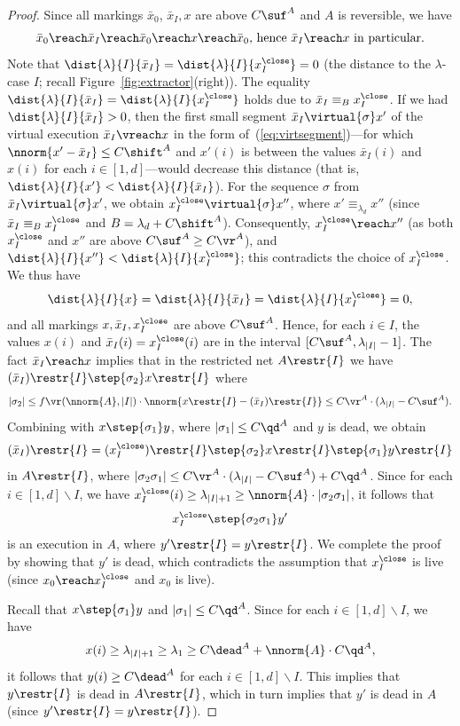 \begin{proof}
	Since all markings $\bar{x}_0$, $\bar{x}_I, x$ are above $C\suf^A$
and $A$ is
	reversible, we have 
	\[\bar{x}_0\reach \bar{x}_I\reach \bar{x}_0\reach
	x\reach\bar{x}_0\text{, hence }\bar{x}_I\reach x\text{ in
	particular.}\]
Note that $\dist{\lambda}{I}{\bar{x}_I}=\dist{\lambda}{I}{x^\close_I}=0$
(the distance to the $\lambda$-case $I$;
recall Figure~\ref{fig:extractor}(right)).
	The equality
	$\dist{\lambda}{I}{\bar{x}_I}=\dist{\lambda}{I}{x^\close_I}$
holds due to $\bar{x}_I\equiv_{B}x^\close_I$. If we had 
	$\dist{\lambda}{I}{\bar{x}_I}>0$, then 
	the first small segment $\bar{x}_I\virtual{\sigma}x'$
	of the virtual execution
	$\bar{x}_I\vreach x$ in the form
	of~(\ref{eq:virtsegment})---for which
	$\nnorm{x'-\bar{x}_I}\leq C\shift^A$ and 
	$x'(i)$ is between the values $\bar{x}_I(i)$ and $x(i)$ for
	each
	$i\in[1,d]$---would decrease this distance 
(that is, $\dist{\lambda}{I}{x'}<\dist{\lambda}{I}{\bar{x}_I}$).
For the sequence $\sigma$ from $\bar{x}_I\virtual{\sigma}x'$, we obtain 
 $x^\close_I\virtual{\sigma}x''$, where  $x'\equiv_{\lambda_d}x''$
 (since  $\bar{x}_I\equiv_{B}x^\close_I$ and
$B=\lambda_d+C\shift^A$). Consequently, 
$x^\close_I\reach x''$ (as both $x^\close_I$ and $x''$ are above
$C\suf^A\geq C\vr^A$), 
and
$\dist{\lambda}{I}{x''}<\dist{\lambda}{I}{x^\close_I}$; this contradicts the choice
of  $x^\close_I$.
We thus have
\[\dist{\lambda}{I}{x}=\dist{\lambda}{I}{\bar{x}_I}=\dist{\lambda}{I}{x^\close_I}=0,\]
and all markings $x,\bar{x}_I,x^\close_I$ are above $C\suf^A$.
Hence, for each $i\in I$, the values $x(i)$ and
$\bar{x}_I(i)=x^\close_I(i)$ are in the interval
$[C\suf^A,\lambda_{|I|}-1]$.
The fact 
$\bar{x}_I\reach x$ implies that in the restricted net $A\restr{I}$ we
have 
$(\bar{x}_I)\restr{I}\step{\sigma_2}x\restr{I}$ where 
\[|\sigma_2|\leq f\vr(\nnorm{A},|I|)\cdot
\nnorm{x\restr{I}-(\bar{x}_I)\restr{I}}\leq C\vr^A\cdot
(\lambda_{|I|}-C\suf^A).\]
Combining with $x\step{\sigma_1}y$, where $|\sigma_1|\leq
C\qd^A$ and $y$ is dead, we obtain
\[(\bar{x}_{I})\restr{I}=(x^\close_{I})\restr{I}\step{\sigma_2}
x\restr{I}\step{\sigma_1}y\restr{I}\]
in $A\restr{I}$, where $|\sigma_2\sigma_1|\leq C\vr^{A}\cdot
(\lambda_{|I|}-C\suf^A)+C\qd^A$.
Since for each $i\in [1,d]\smallsetminus I$, we have
$x^\close_{I}(i)\geq\lambda_{|I|+1}\geq \nnorm{A}\cdot
|\sigma_2\sigma_1|$, it follows that 
\[x^\close_{I}\step{\sigma_2\sigma_1}y'\]
is an execution in $A$, where $y'\restr{I}=y\restr{I}$.
We complete the proof by showing that $y'$ is dead, which
contradicts the assumption that $x^\close_{I}$ is live (since 
$x_0\reach x^\close_{I}$ and $x_0$ is live).

Recall that $x\step{\sigma_1}y$ and $|\sigma_1|\leq C\qd^A$.
Since for each $i\in [1,d]\smallsetminus I$, we have 
\[x(i)\geq
\lambda_{|I|+1}\geq \lambda_1\geq C\dead^A+ \nnorm{A}\cdot C\qd^A,\]
it follows that 
$y(i)\geq C\dead^A$ for each  $i\in [1,d]\smallsetminus I$. This implies
that $y\restr{I}$ is dead in $A\restr{I}$, which in turn
implies that $y'$ is dead in $A$ (since
$y'\restr{I}=y\restr{I}$).
\end{proof}

